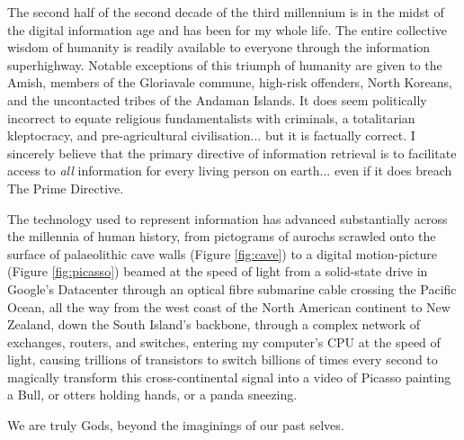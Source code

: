 The second half of the second decade of the third millennium is in the midst of the digital information age and has been for my whole life. The entire collective wisdom of humanity is readily available to everyone through the information superhighway. Notable exceptions of this triumph of humanity are given to the Amish, members of the Gloriavale commune, high-risk offenders, North Koreans, and the uncontacted tribes of the Andaman Islands. It does seem politically incorrect to equate religious fundamentalists with criminals, a totalitarian kleptocracy, and pre-agricultural civilisation... but it is factually correct. I sincerely believe that the primary directive of information retrieval is to facilitate access to \textit{all} information for every living person on earth... even if it does breach The Prime Directive.

The technology used to represent information has advanced substantially across the millennia of human history, from pictograms of aurochs scrawled onto the surface of palaeolithic cave walls (Figure \ref{fig:cave}) to a digital motion-picture (Figure \ref{fig:picasso}) beamed at the speed of light from a solid-state drive in Google's Datacenter through an optical fibre submarine cable crossing the Pacific Ocean, all the way from the west coast of the North American continent to New Zealand, down the South Island's backbone, through a complex network of exchanges, routers, and switches, entering my computer's CPU at the speed of light, causing trillions of transistors to switch billions of times every second to magically transform this cross-continental signal into a video of Picasso painting a Bull, or otters holding hands, or a panda sneezing.

We are truly Gods, beyond the imaginings of our past selves.

